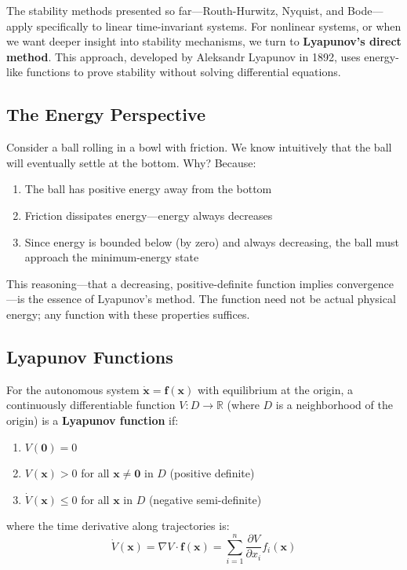 The stability methods presented so far---Routh-Hurwitz, Nyquist, and Bode---apply specifically to linear time-invariant systems. For nonlinear systems, or when we want deeper insight into stability mechanisms, we turn to \textbf{Lyapunov's direct method}. This approach, developed by Aleksandr Lyapunov in 1892, uses energy-like functions to prove stability without solving differential equations.

\subsection{The Energy Perspective}

Consider a ball rolling in a bowl with friction. We know intuitively that the ball will eventually settle at the bottom. Why? Because:

\begin{enumerate}
    \item The ball has positive energy away from the bottom
    \item Friction dissipates energy---energy always decreases
    \item Since energy is bounded below (by zero) and always decreasing, the ball must approach the minimum-energy state
\end{enumerate}

This reasoning---that a decreasing, positive-definite function implies convergence---is the essence of Lyapunov's method. The function need not be actual physical energy; any function with these properties suffices.

\subsection{Lyapunov Functions}

\begin{definition}
\label{def:lyapunov_function}
For the autonomous system $\dot{\mathbf{x}} = \mathbf{f}(\mathbf{x})$ with equilibrium at the origin, a continuously differentiable function $V: D \to \mathbb{R}$ (where $D$ is a neighborhood of the origin) is a \textbf{Lyapunov function} if:
\begin{enumerate}
    \item $V(\mathbf{0}) = 0$
    \item $V(\mathbf{x}) > 0$ for all $\mathbf{x} \neq \mathbf{0}$ in $D$ (positive definite)
    \item $\dot{V}(\mathbf{x}) \leq 0$ for all $\mathbf{x}$ in $D$ (negative semi-definite)
\end{enumerate}
where the time derivative along trajectories is:
\begin{equation}
\dot{V}(\mathbf{x}) = \nabla V \cdot \mathbf{f}(\mathbf{x}) = \sum_{i=1}^{n} \frac{\partial V}{\partial x_i} f_i(\mathbf{x})
\end{equation}
\end{definition}

